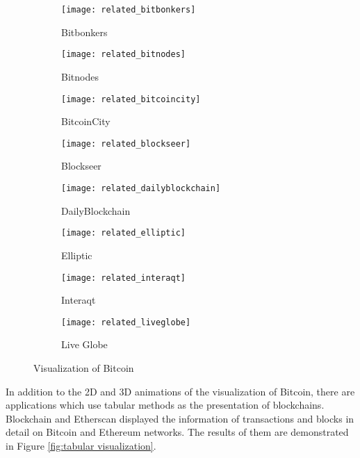 \begin{figure}[htb]
    \centering
    \begin{subfigure}[b]{0.3\textwidth}
        \centering
        \texttt{[image: related\_bitbonkers]}
        \caption{Bitbonkers}
    \end{subfigure}
    \hfill
    \begin{subfigure}[b]{0.3\textwidth}
        \centering
        \texttt{[image: related\_bitnodes]}
        \caption{Bitnodes}
    \end{subfigure}
    \hfill
    \begin{subfigure}[b]{0.3\textwidth}
        \centering
        \texttt{[image: related\_bitcoincity]}
        \caption{BitcoinCity}
    \end{subfigure}

    \begin{subfigure}[b]{0.3\textwidth}
        \centering
        \texttt{[image: related\_blockseer]}
        \caption{Blockseer}
    \end{subfigure}
    \hfill
    \begin{subfigure}[b]{0.3\textwidth}
        \centering
        \texttt{[image: related\_dailyblockchain]}
        \caption{DailyBlockchain}
    \end{subfigure}
    \hfill
    \begin{subfigure}[b]{0.3\textwidth}
        \centering
        \texttt{[image: related\_elliptic]}
        \caption{Elliptic}
    \end{subfigure}

    \begin{subfigure}[b]{0.3\textwidth}
        \centering
        \texttt{[image: related\_interaqt]}
        \caption{Interaqt}
    \end{subfigure}
    \hspace{1cm}
    \begin{subfigure}[b]{0.3\textwidth}
        \centering
        \texttt{[image: related\_liveglobe]}
        \caption{Live Globe}
    \end{subfigure}

    \caption{Visualization of Bitcoin}
    \label{fig:visualization of bitcoin}
\end{figure}

In addition to the 2D and 3D animations of the visualization of Bitcoin, there are applications which use tabular methods as the presentation of blockchains. Blockchain \cite{blockchain} and Etherscan \cite{etherscan} displayed the information of transactions and blocks in detail on Bitcoin and Ethereum networks. The results of them are demonstrated in Figure \ref{fig:tabular visualization}.

